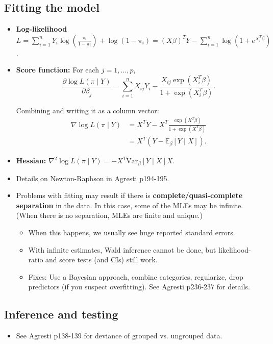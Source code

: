 \documentclass[twoside]{article}
\newcommand\dis{\displaystyle}
\newcommand\bbE{\mathbb{E}}
\begin{document}
\subsection{Fitting the model} 
\begin{itemize}
\item \textbf{Log-likelihood} $L = \dis\sum_{i=1}^n Y_i \log \left( \frac{\pi_i}{1 - \pi_i} \right) + \log (1 - \pi_i) = (X\beta)^T Y - \dis\sum_{i=1}^n \log \left(1 + e^{X_i^T \beta} \right)$.

\item \textbf{Score function:} For each $j = 1, \dots, p$,
\begin{equation*}
\frac{\partial \log L(\pi \mid Y)}{\partial \beta_j} = \sum_{i = 1}^n X_{ij} Y_i - \frac{X_{ij} \exp (X_i^T \beta)}{1 + \exp (X_i^T \beta)}.
\end{equation*}

Combining and writing it as a column vector:
\begin{align*}
\nabla \log L(\pi \mid Y) &= X^T Y - X^T \frac{\exp(X^T \beta)}{1 + \exp(X^T \beta)} \\ 
&= X^T \left( Y - \bbE_\beta [Y \mid X ] \right).
\end{align*}

\item \textbf{Hessian:} $\nabla^2 \log L(\pi \mid Y) = -X^T \text{Var}_\beta[Y \mid X] X$.

\item Details on Newton-Raphson in Agresti p194-195.

\item Problems with fitting may result if there is \textbf{complete/quasi-complete separation} in the data. In this case, some of the MLEs may be infinite. (When there is no separation, MLEs are finite and unique.)
\begin{itemize}
\item When this happens, we usually see huge reported standard errors.
\item With infinite estimates, Wald inference cannot be done, but likelihood-ratio and score tests (and CIs) still work.
\item Fixes: Use a Bayesian approach, combine categories, regularize, drop predictors (if you suspect overfitting). See Agresti p236-237 for details.
\end{itemize}

\end{itemize}

\subsection{Inference and testing}
\begin{itemize}
\item See Agresti p138-139 for deviance of grouped vs. ungrouped data.
\end{itemize}
\end{document}
